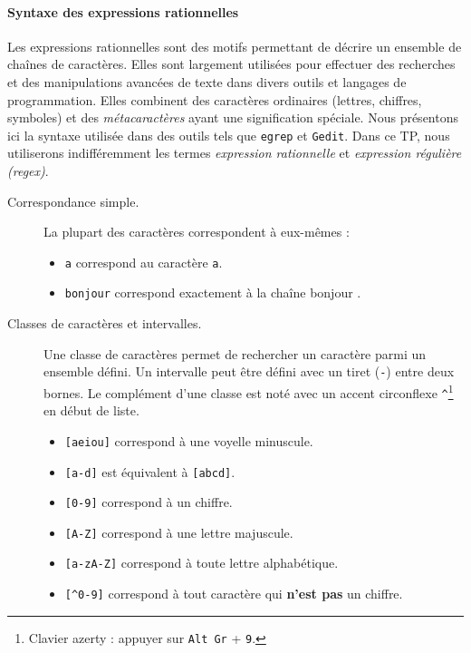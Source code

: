 \documentclass{td}
\begin{document}
\paragraph{Syntaxe des expressions rationnelles}
Les expressions rationnelles sont des motifs permettant de décrire un ensemble de chaînes de caractères.
Elles sont largement utilisées pour effectuer des recherches et des manipulations avancées de texte dans divers outils et langages de programmation.
Elles combinent des caractères ordinaires (lettres, chiffres, symboles) et des \emph{métacaractères} ayant une signification spéciale.
Nous présentons ici la syntaxe utilisée dans des outils tels que \texttt{egrep} et \texttt{Gedit}.
Dans ce TP, nous utiliserons indifféremment les termes \emph{expression rationnelle} et \emph{expression régulière (regex)}.

\begin{description}
\item[Correspondance simple.] La plupart des caractères correspondent à eux-mêmes :
  \begin{itemize}
  \item \lstinline{a} correspond au caractère \texttt{a}.
  \item \lstinline{bonjour} correspond exactement à la chaîne \og bonjour \fg.
  \end{itemize}

\item[Classes de caractères et intervalles.] Une classe de caractères permet de rechercher un caractère parmi un ensemble défini.
  Un intervalle peut être défini avec un tiret (\lstinline{-}) entre deux bornes. 
  Le complément d'une classe est noté avec un accent circonflexe \lstinline{^}\footnote{Clavier azerty : appuyer sur \texttt{Alt Gr} + \texttt{9}.} en début de liste.
  \begin{itemize}
  \item \lstinline{[aeiou]} correspond à une voyelle minuscule.
  \item \lstinline{[a-d]} est équivalent à \lstinline{[abcd]}.
  \item \lstinline{[0-9]} correspond à un chiffre.
  \item \lstinline{[A-Z]} correspond à une lettre majuscule.
  \item \lstinline{[a-zA-Z]} correspond à toute lettre alphabétique.
  \item \lstinline{[^0-9]} correspond à tout caractère qui \textbf{n'est pas} un chiffre.
  \end{itemize}


\end{description}
\end{document}
